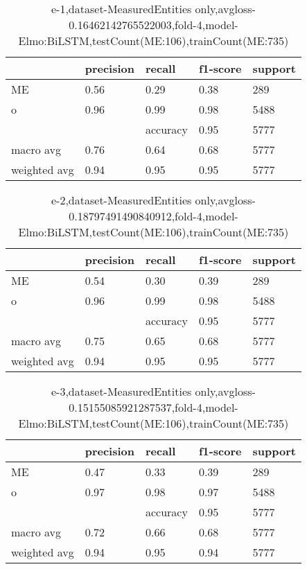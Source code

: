\begin{table}[!ht] 
\centering
\caption{e-1,dataset-MeasuredEntities only,avgloss-0.16462142765522003,fold-4,model-Elmo:BiLSTM,testCount(ME:106),trainCount(ME:735)}\label{e-1data-meS.tsv}
\begin{tabularx}{300pt}{|X|X|X|X|X|}
\hline
&precision&recall&f1-score&support\\
\hline
ME&0.56&0.29&0.38&289\\
\hline
o&0.96&0.99&0.98&5488\\
\hline
&&accuracy&0.95&5777\\
\hline
macro avg&0.76&0.64&0.68&5777\\
\hline
weighted avg&0.94&0.95&0.95&5777\\
\hline
\end{tabularx}
\end{table}
\begin{table}[!ht] 
\centering
\caption{e-2,dataset-MeasuredEntities only,avgloss-0.18797491490840912,fold-4,model-Elmo:BiLSTM,testCount(ME:106),trainCount(ME:735)}\label{e-2data-meS.tsv}
\begin{tabularx}{300pt}{|X|X|X|X|X|}
\hline
&precision&recall&f1-score&support\\
\hline
ME&0.54&0.30&0.39&289\\
\hline
o&0.96&0.99&0.98&5488\\
\hline
&&accuracy&0.95&5777\\
\hline
macro avg&0.75&0.65&0.68&5777\\
\hline
weighted avg&0.94&0.95&0.95&5777\\
\hline
\end{tabularx}
\end{table}
\begin{table}[!ht] 
\centering
\caption{e-3,dataset-MeasuredEntities only,avgloss-0.15155085921287537,fold-4,model-Elmo:BiLSTM,testCount(ME:106),trainCount(ME:735)}\label{e-3data-meS.tsv}
\begin{tabularx}{300pt}{|X|X|X|X|X|}
\hline
&precision&recall&f1-score&support\\
\hline
ME&0.47&0.33&0.39&289\\
\hline
o&0.97&0.98&0.97&5488\\
\hline
&&accuracy&0.95&5777\\
\hline
macro avg&0.72&0.66&0.68&5777\\
\hline
weighted avg&0.94&0.95&0.94&5777\\
\hline
\end{tabularx}
\end{table}
